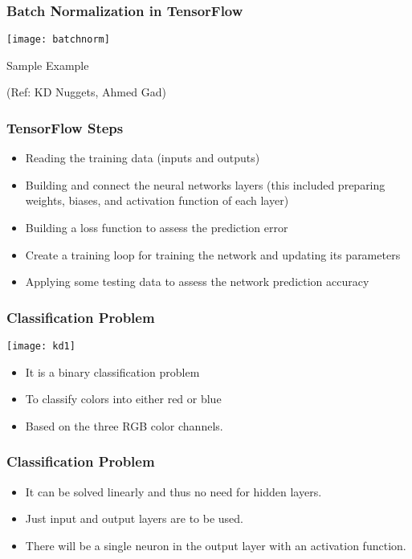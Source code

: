 \begin{frame}[fragile] \frametitle{Batch Normalization in TensorFlow}
\begin{center}
\texttt{[image: batchnorm]}
\end{center}
\end{frame}


\begin{frame}
  \begin{center}
    {\Large Sample Example}
    
    (Ref: KD Nuggets, Ahmed Gad)
  \end{center}
\end{frame}

\begin{frame}[fragile] \frametitle{TensorFlow Steps}
\begin{itemize}
\item Reading the training data (inputs and outputs)
\item Building and connect the neural networks layers (this included preparing weights, biases, and activation function of each layer)
\item Building a loss function to assess the prediction error
\item Create a training loop for training the network and updating its parameters
\item Applying some testing data to assess the network prediction accuracy 
\end{itemize}
\end{frame}

\begin{frame}[fragile] \frametitle{Classification Problem}
\begin{center}
\texttt{[image: kd1]}
\end{center}
\begin{itemize}
\item It is a binary classification problem 
\item To classify colors into either red or blue
\item Based on the three RGB color channels.
\end{itemize}
\end{frame}

\begin{frame}[fragile] \frametitle{Classification Problem}

\begin{itemize}
\item It can be solved linearly and thus no need for hidden layers. 
\item Just input and output layers are to be used. 
\item There will be a single neuron in the output layer with an activation function.
\end{itemize}
\end{frame}


